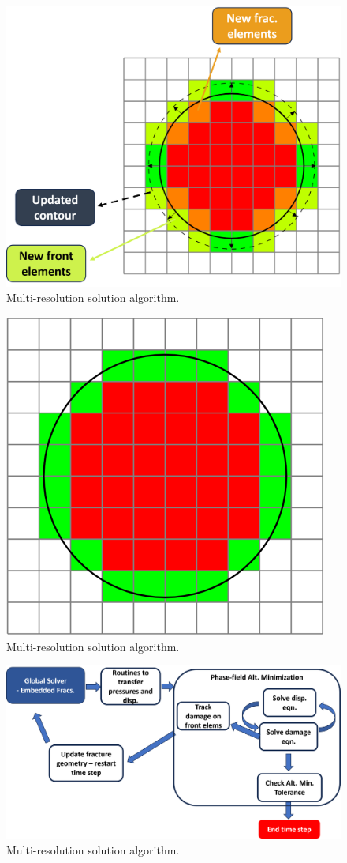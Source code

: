 \begin{figure}[h]
    \centering
    \includegraphics[width=\linewidth]{Chapter4/figures/larger_penny_with_descriptions.png}
    \caption{Multi-resolution solution algorithm.}
    \label{fig:lorem2}
\end{figure}

\begin{figure}[h]
    \centering
    \includegraphics[width=0.5\linewidth]{Chapter4/figures/larger_penny.png}
    \caption{Multi-resolution solution algorithm.}
    \label{fig:lorem3}
\end{figure}

\begin{figure}[h]
    \centering
    \includegraphics[width=\linewidth]{Chapter4/figures/planar3D_algorithm.png}
    \caption{Multi-resolution solution algorithm.}
    \label{fig:lorem5}
\end{figure}

